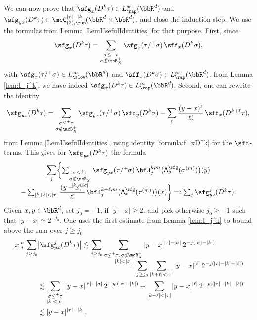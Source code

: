 We can now prove that $\sfg_x(D^k\tau)\in L_\rap^\infty(\bbR^d)$ and ${\sfg}_{yx}(D^k\tau)\in\mcC^{|\tau|-|k|}_{(2),\rap}(\bbR^d\times\bbR^d)$, and close the induction step. We use the formulas from Lemma \ref{LemUsefulIdentities} for that purpose. First, since
\[
\sfg_x(D^k\tau) = \sum_{\substack{\sigma\leq^+\tau\\\sigma\notin\mcB_X^+}} \sfg_x(\tau/^+\sigma)\,\sff_x(D^k\sigma),
\]
with $\sfg_x(\tau/^+\sigma)\in L_\slow^\infty(\bbR^d)$ and $\sff_x(D^k\sigma)\in L_\rap^\infty(\bbR^d)$, from Lemma \ref{lem:I_j^k}, we have indeed $\sfg_x(D^k\tau)\in L_\rap^\infty(\bbR^d)$. Second, one can rewrite the identity
\[
\sfg_{yx}(D^k\tau) = \sum_{\substack{\sigma\leq^+\tau\\\sigma\notin\mcB_X^+}} \sfg_{yx}(\tau/^+\sigma)\,\sff_y(D^k\sigma) - \sum_{\ell}\frac{(y-x)^\ell}{\ell!}\,\sff_x(D^{k+\ell}\tau),
\]
from Lemma \ref{LemUsefulIdentities}, using identity \eqref{formula:f_xD^k} for the $\sff$-terms. This gives for $\sfg_{yx}(D^k\tau)$ the formula
\begin{multline*}
\sum_j
\biggl\{
\textstyle\sum_{\substack{\sigma\le^+\tau\\ \sigma\notin\mcB_X^+\\|k|<|\sigma|}} \sfg_{yx}(\tau/^+\sigma)\,\bfJ_j^{k,m}\bigl({\sf\Lambda}^{\sfg}_y(\sigma^{(m)})\bigr)(y)\\[-10pt]
\textstyle - \sum_{|k+\ell|<|\tau|}\dfrac{(y-x)^\ell}{\ell!}\,\bfJ_j^{k+\ell, m}\bigl({\sf\Lambda}^{\sfg}_x(\tau^{(m)})\bigr)(x)
\biggr\}=: \sum_j\sfg_{yx}^j(D^k\tau).
\end{multline*}
Given $x,y\in\bbR^d$, set $j_0=-1$, if $|y-x|\ge2$, and pick otherwise $j_0\ge-1$ such that $|y-x|\simeq2^{-j_0}$. One uses the first estimate from Lemma \ref{lem:I_j^k} to bound above the sum over $j\ge j_0$
\begin{equation}
\begin{split} \label{EqEstimate}
|x|_*^a\sum_{j\ge j_0}&\big|\sfg_{yx}^j(D^k\tau)\big| \lesssim \sum_{j\ge j_0}\sum_{\substack{\sigma\le^+\tau,\,\sigma\notin\mcB_X^+\\|k|<|\sigma|}} |y-x|^{|\tau|-|\sigma|}\,2^{-j(|\sigma|-|k|)}\\[-10pt]
&\hspace*{4.6cm}+ \sum_{j\ge j_0}\sum_{|k+\ell|<|\tau|}|y-x|^{|\ell|}\,2^{-j(|\tau|-|k|-|\ell|)}\\
&\lesssim \sum_{\substack{\sigma\le^+\tau\\|k|<|\sigma|}} |y-x|^{|\tau|-|\sigma|}\,2^{-j_0(|\sigma|-|k|)} + \sum_{|k+\ell|<|\tau|}|y-x|^{|\ell|}\,2^{-j_0(|\tau|-|k|-|\ell|)} \\
&\lesssim|y-x|^{|\tau|-|k|}.
\end{split}
\end{equation}
